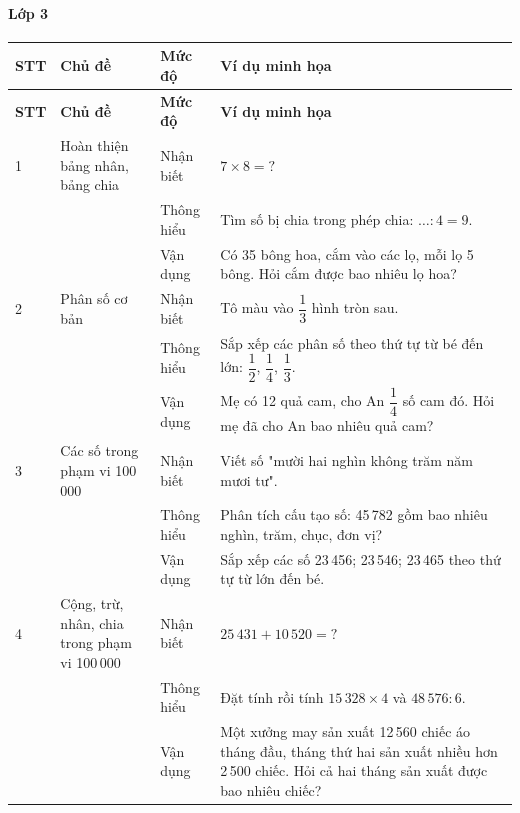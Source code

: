 \paragraph{Lớp 3}
\renewcommand{\arraystretch}{1.3}
\begin{longtable}{|>{\centering\arraybackslash}m{0.8cm}|m{3.5cm}|>{\centering\arraybackslash}m{2cm}|m{7.5cm}|}
	\hline
	\textbf{STT} & \textbf{Chủ đề} & \textbf{Mức độ} & \textbf{Ví dụ minh họa} \\
	\hline
	\endfirsthead
	\hline
	\textbf{STT} & \textbf{Chủ đề} & \textbf{Mức độ} & \textbf{Ví dụ minh họa} \\
	\hline
	\endhead
	\hline
	\endfoot

	1 & Hoàn thiện bảng nhân, bảng chia
	& Nhận biết & $7 \times 8 = ?$ \\
	\cline{3-4}
	& & Thông hiểu & Tìm số bị chia trong phép chia: $\ldots : 4 = 9$. \\
	\cline{3-4}
	& & Vận dụng & Có 35 bông hoa, cắm vào các lọ, mỗi lọ 5 bông. Hỏi cắm được bao nhiêu lọ hoa? \\
	\hline

	2 & Phân số cơ bản
	& Nhận biết & Tô màu vào $\dfrac{1}{3}$ hình tròn sau. \\
	\cline{3-4}
	& & Thông hiểu & Sắp xếp các phân số theo thứ tự từ bé đến lớn: $\dfrac{1}{2}$, $\dfrac{1}{4}$, $\dfrac{1}{3}$. \\
	\cline{3-4}
	& & Vận dụng & Mẹ có 12 quả cam, cho An $\dfrac{1}{4}$ số cam đó. Hỏi mẹ đã cho An bao nhiêu quả cam? \\
	\hline

	3 & Các số trong phạm vi 100\,000
	& Nhận biết & Viết số "mười hai nghìn không trăm năm mươi tư". \\
	\cline{3-4}
	& & Thông hiểu & Phân tích cấu tạo số: 45\,782 gồm bao nhiêu nghìn, trăm, chục, đơn vị? \\
	\cline{3-4}
	& & Vận dụng & Sắp xếp các số 23\,456; 23\,546; 23\,465 theo thứ tự từ lớn đến bé. \\
	\hline

	4 & Cộng, trừ, nhân, chia trong phạm vi 100\,000
	& Nhận biết & $25\,431 + 10\,520 = ?$ \\
	\cline{3-4}
	& & Thông hiểu & Đặt tính rồi tính $15\,328 \times 4$ và $48\,576 : 6$. \\
	\cline{3-4}
	& & Vận dụng & Một xưởng may sản xuất 12\,560 chiếc áo tháng đầu, tháng thứ hai sản xuất nhiều hơn 2\,500 chiếc. Hỏi cả hai tháng sản xuất được bao nhiêu chiếc? \\
	\hline


\end{longtable}
